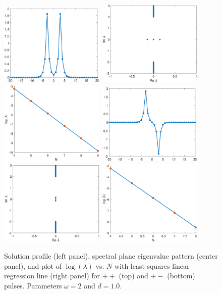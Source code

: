 \documentclass[12pt]{article}
\begin{document}
\begin{figure}[H]
\centering
\includegraphics[width=5cm]{dnlsPP.eps}
\includegraphics[width=5cm]{dnlsPPeig.eps}
\includegraphics[width=5cm]{dnlsPPdecay.eps}
\includegraphics[width=5cm]{dnlsPM.eps}
\includegraphics[width=5cm]{dnlsPMeig.eps}
\includegraphics[width=5cm]{dnlsPMdecay.eps}
\caption{Solution profile (left panel), spectral plane eigenvalue pattern (center panel), and plot of $\log(\lambda)$ vs. $N$ with least squares linear regression line (right panel) for $++$ (top) and $+-$ (bottom) pulses. Parameters $\omega = 2$ and $d = 1.0$.}
\label{fig:eigendecay1}
\end{figure}
\end{document}
